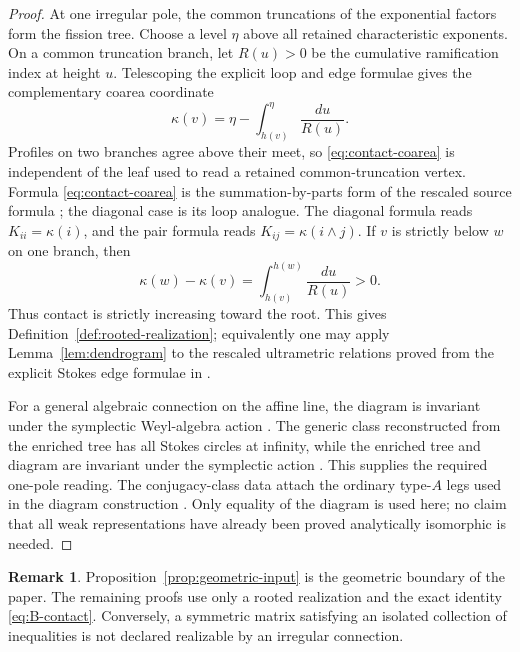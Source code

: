 \documentclass[11pt,a4paper]{amsart}
\theoremstyle{plain}
\theoremstyle{definition}
\newtheorem{remark}[theorem]{Remark}
\begin{document}
\begin{proof}
At one irregular pole, the common truncations of the exponential factors form the fission tree.
Choose a level $\eta$ above all retained characteristic exponents.  On a common truncation branch,
let $R(u)>0$ be the cumulative ramification index at height $u$.  Telescoping the explicit loop and
edge formulae gives the complementary coarea coordinate
\begin{equation}\label{eq:contact-coarea}
 \kappa(v)=\eta-\int_{h(v)}^\eta\frac{du}{R(u)}.
\end{equation}
Profiles on two branches agree above their meet, so \eqref{eq:contact-coarea} is independent of
the leaf used to read a retained common-truncation vertex.  Formula
\eqref{eq:contact-coarea} is the summation-by-parts form of the rescaled source formula
\cite[Lemma~4.3]{Doucot2025Graphs}; the diagonal case is its loop analogue.  The diagonal formula reads
$K_{ii}=\kappa(i)$, and the pair formula reads $K_{ij}=\kappa(i\wedge j)$.  If $v$ is strictly below
$w$ on one branch, then
\[
 \kappa(w)-\kappa(v)=\int_{h(v)}^{h(w)}\frac{du}{R(u)}>0.
\]
Thus contact is strictly increasing toward the root.  This gives
Definition~\ref{def:rooted-realization}; equivalently one may apply Lemma~\ref{lem:dendrogram} to
the rescaled ultrametric relations proved from the explicit Stokes edge formulae in
\cite[Theorem~4.2]{Doucot2025Graphs}.

For a general algebraic connection on the affine line, the diagram is invariant under the
symplectic Weyl-algebra action \cite{Doucot2021Diagrams}.  The generic class reconstructed from the
enriched tree has all Stokes circles at infinity, while the enriched tree and diagram are invariant
under the symplectic action \cite[Theorems~1.4--1.6]{Doucot2026Basic}.  This supplies the required
one-pole reading.  The conjugacy-class data attach the ordinary type-$A$ legs used in the diagram
construction \cite{BoalchYamakawa2020,Doucot2026Basic}.  Only equality of the diagram is used here;
no claim that all weak representations have already been proved analytically isomorphic is needed.
\end{proof}

\begin{remark}
Proposition~\ref{prop:geometric-input} is the geometric boundary of the paper.  The remaining
proofs use only a rooted realization and the exact identity \eqref{eq:B-contact}.  Conversely, a
symmetric matrix satisfying an isolated collection of inequalities is not declared realizable by
an irregular connection.
\end{remark}
\end{document}
